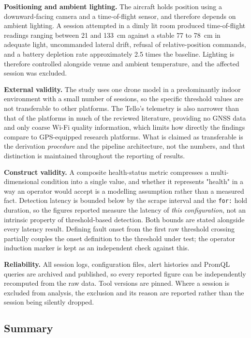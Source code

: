 \noindent\textbf{Positioning and ambient lighting.} The aircraft holds position
using a downward-facing camera and a time-of-flight sensor, and therefore depends
on ambient lighting. A session attempted in a dimly lit room produced
time-of-flight readings ranging between \SI{21}{} and \SI{133}{\centi\metre}
against a stable \SI{77}{} to \SI{78}{\centi\metre} in adequate light,
uncommanded lateral drift, refusal of relative-position commands, and a battery
depletion rate approximately \num{2.5} times the baseline. Lighting is therefore
controlled alongside venue and ambient temperature, and the affected session was
excluded.

\noindent\textbf{External validity.} The study uses one drone model in a
predominantly indoor environment with a small number of sessions, so the specific
threshold values are not transferable to other platforms. The Tello's telemetry
is also narrower than that of the platforms in much of the reviewed literature,
providing no GNSS data and only coarse Wi-Fi quality information, which limits
how directly the findings compare to GPS-equipped research platforms. What is
claimed as transferable is the derivation \textit{procedure} and the pipeline
architecture, not the numbers, and that distinction is maintained throughout the
reporting of results.

\noindent\textbf{Construct validity.} A composite health-status metric compresses
a multi-dimensional condition into a single value, and whether it represents
"health" in a way an operator would accept is a modelling assumption rather than
a measured fact. Detection latency is bounded below by the scrape interval and
the \texttt{for:} hold duration, so the figures reported measure the latency of
\textit{this configuration}, not an intrinsic property of threshold-based
detection. Both bounds are stated alongside every latency result. Defining fault
onset from the first raw threshold crossing partially couples the onset
definition to the threshold under test; the operator induction marker is kept as
an independent check against this.

\noindent\textbf{Reliability.} All session logs, configuration files, alert
histories and PromQL queries are archived and published, so every reported figure
can be independently recomputed from the raw data. Tool versions are pinned.
Where a session is excluded from analysis, the exclusion and its reason are
reported rather than the session being silently dropped.

\subsection{Summary}~\label{subsec:method-summary}

